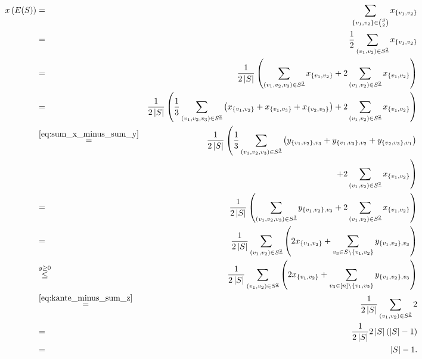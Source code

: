 \documentclass[10p,a4paper,BCOR = 12mm, DIV=15]{scrbook}
\begin{document}
{\begin{bew}
{
\allowdisplaybreaks
\begin{eqnarray*}
x\left(E(S)\right) & = & \sum_{\left\{v_1, v_2\right\}\in {S \choose 2}} x_{\left\{v_1, v_2\right\}} \\
& = & \frac{1}{2} \sum_{\left(v_1, v_2\right)\in S^{\underline{2}}} x_{\left\{v_1, v_2\right\}} \\
& = & \frac{1}{2 \left|S\right|} \left( \sum_{\left(v_1, v_2, v_3\right)\in S^{\underline{3}}} x_{\left\{v_1, v_2\right\}} + 2 \sum_{\left(v_1, v_2\right) \in S^{\underline{2}}} x_{\left\{v_1, v_2\right\}} \right) \\
& = & \frac{1}{2 \left|S\right|} \left(\frac{1}{3} \sum_{\left(v_1, v_2, v_3\right) \in S^{\underline{3}}} \left(x_{\left\{v_1, v_2\right\}} + x_{\left\{v_1, v_3\right\}} + x_{\left\{v_2, v_3\right\}}\right) + 2 \sum_{\left(v_1, v_2\right) \in S^{\underline{2}}} x_{\left\{v_1, v_2\right\}} \right) \\
& \stackrel{\eqref{eq:sum_x_minus_sum_y}}{=} & \frac{1}{2 \left|S\right|} \left(\frac{1}{3} \sum_{\left(v_1, v_2, v_3\right)\in S^{\underline{3}}} \left(y_{\left\{v_1, v_2\right\}, v_3} + y_{\left\{v_1, v_3\right\}, v_2} + y_{\left\{v_2, v_3\right\}, v_1}\right) \right. \\
& & \left.+ 2 \sum_{\left(v_1, v_2\right) \in S^{\underline{2}}} x_{\left\{v_1, v_2\right\}} \right) \\
& = & \frac{1}{2 \left|S\right|} \left(\sum_{\left(v_1, v_2, v_3\right) \in S^{\underline{3}}} y_{\left\{v_1, v_2\right\}, v_3} + 2 \sum_{\left(v_1, v_2\right)\in S^{\underline{2}}} x_{\left\{v_1, v_2\right\}} \right) \\
& = & \frac{1}{2 \left|S\right|} \sum_{\left(v_1, v_2\right) \in S^{\underline{2}}} \left(
2 x_{\left\{v_1, v_2\right\}} + 
\sum_{v_3\in S \backslash \left\{v_1, v_2\right\}} y_{\left\{v_1, v_2\right\}, v_3} \right) \\
& \stackrel{y\geq 0}{\leq} & \frac{1}{2 \left|S\right|} \sum_{\left(v_1, v_2\right) \in S^{\underline{2}}} \left(
2 x_{\left\{v_1, v_2\right\}} + 
\sum_{v_3\in \left[n\right] \backslash \left\{v_1, v_2\right\}} y_{\left\{v_1, v_2\right\}, v_3} \right) \\
& \stackrel{\eqref{eq:kante_minus_sum_z}}{=} & \frac{1}{2 \left|S\right|} \sum_{\left(v_1, v_2\right) \in S^{\underline{2}}} 2 \\
& = & \frac{1}{2 \left|S\right|} 2 \left|S\right| \left(\left|S\right|-1\right)\\
& = & \left|S\right|-1.
\end{eqnarray*}
}


\end{bew}}
\end{document}
